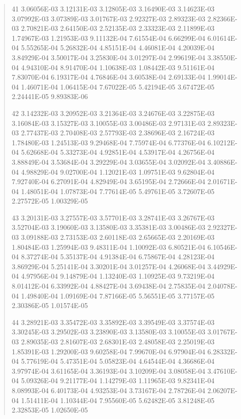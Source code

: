 \documentclass[letterpaper,10pt,english]{sphinxmanual}
\begin{document}
\begin{quote}
\begin{DUlineblock}{0em}
\item[] 41   3.06056E-03  3.12131E-03  3.12805E-03  3.16490E-03  3.14623E-03  3.07992E-03  3.07389E-03  3.01767E-03  2.92327E-03  2.89323E-03  2.82366E-03  2.70821E-03  2.64150E-03  2.52135E-03  2.33323E-03  2.11899E-03  1.74967E-03  1.21953E-03  9.11132E-04  7.61554E-04  6.66299E-04  6.01614E-04  5.55265E-04  5.26832E-04  4.85151E-04  4.46081E-04  4.20039E-04  3.84929E-04  3.50017E-04  3.25830E-04  3.01297E-04  2.99619E-04  3.38550E-04  4.94310E-04  8.91470E-04  1.10638E-03  1.08442E-03  9.51161E-04  7.83070E-04  6.19317E-04  4.76846E-04  3.60538E-04  2.69133E-04  1.99014E-04  1.46071E-04  1.06415E-04  7.67022E-05  5.42194E-05  3.67472E-05  2.24441E-05  9.89383E-06
\item[] 42   3.14232E-03  3.20952E-03  3.21364E-03  3.24676E-03  3.22875E-03  3.16084E-03  3.15327E-03  3.10055E-03  3.00486E-03  2.97131E-03  2.89323E-03  2.77437E-03  2.70408E-03  2.57793E-03  2.38696E-03  2.16724E-03  1.78480E-03  1.24513E-03  9.29468E-04  7.75974E-04  6.77376E-04  6.10212E-04  5.62668E-04  5.33273E-04  4.92851E-04  4.53917E-04  4.26756E-04  3.88849E-04  3.53684E-04  3.29229E-04  3.03655E-04  3.02092E-04  3.40886E-04  4.98829E-04  9.02700E-04  1.12021E-03  1.09751E-03  9.62804E-04  7.92740E-04  6.27091E-04  4.82949E-04  3.65195E-04  2.72666E-04  2.01671E-04  1.48051E-04  1.07873E-04  7.77614E-05  5.49761E-05  3.72607E-05  2.27572E-05  1.00329E-05
\item[] 43   3.20131E-03  3.27557E-03  3.57701E-03  3.28741E-03  3.26767E-03  3.52704E-03  3.19060E-03  3.13580E-03  3.35381E-03  3.00486E-03  2.92327E-03  3.09188E-03  2.73153E-03  2.60118E-03  2.65665E-03  2.20169E-03  1.80484E-03  1.25994E-03  9.48311E-04  1.10092E-03  6.80521E-04  6.10546E-04  8.37274E-04  5.35137E-04  4.91384E-04  6.75867E-04  4.28123E-04  3.86929E-04  5.25141E-04  3.30201E-04  3.01257E-04  4.26068E-04  3.44929E-04  4.97956E-04  9.14879E-04  1.13240E-03  1.10925E-03  9.73219E-04  8.01412E-04  6.33992E-04  4.88427E-04  3.69438E-04  2.75835E-04  2.04078E-04  1.49840E-04  1.09169E-04  7.87166E-05  5.56551E-05  3.77157E-05  2.30386E-05  1.01574E-05
\item[] 44   3.28921E-03  3.35472E-03  3.35892E-03  3.39549E-03  3.37574E-03  3.30245E-03  3.29502E-03  3.23890E-03  3.13580E-03  3.10055E-03  3.01767E-03  2.89035E-03  2.81607E-03  2.68301E-03  2.48058E-03  2.25019E-03  1.85391E-03  1.29200E-03  9.60258E-04  7.99670E-04  6.97904E-04  6.28332E-04  5.77619E-04  5.47351E-04  5.05823E-04  4.64544E-04  4.36686E-04  3.97974E-04  3.61165E-04  3.36193E-04  3.10209E-04  3.08058E-04  3.47610E-04  5.09326E-04  9.21177E-04  1.14279E-03  1.11965E-03  9.82341E-04  8.08993E-04  6.40173E-04  4.93253E-04  3.73167E-04  2.78726E-04  2.06207E-04  1.51411E-04  1.10344E-04  7.95560E-05  5.62482E-05  3.81248E-05  2.32853E-05  1.02650E-05

\end{DUlineblock}
\end{quote}
\end{document}
